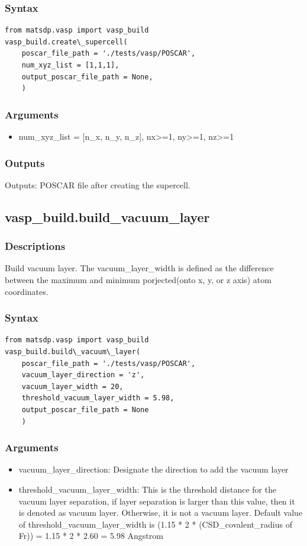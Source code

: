 \documentclass[12pt]{book}
\begin{document}
\subsubsection{Syntax}
\begin{lstlisting}
from matsdp.vasp import vasp_build
vasp_build.create\_supercell(
    poscar_file_path = './tests/vasp/POSCAR', 
    num_xyz_list = [1,1,1], 
    output_poscar_file_path = None,
    )
\end{lstlisting}

\subsubsection{Arguments}
\begin{itemize}
\item num\_xyz\_list = [n\_x, n\_y, n\_z], nx>=1, ny>=1, nz>=1
\end{itemize}

\subsubsection{Outputs}
Outputs: POSCAR file after creating the supercell.


\subsection{vasp\_build.build\_vacuum\_layer}
\subsubsection{Descriptions}
Build vacuum layer. The vacuum\_layer\_width is defined as the difference between the maximum and minimum porjected(onto x, y, or z axis) atom coordinates.

\subsubsection{Syntax}
\begin{lstlisting}
from matsdp.vasp import vasp_build
vasp_build.build\_vacuum\_layer(
    poscar_file_path = './tests/vasp/POSCAR', 
    vacuum_layer_direction = 'z', 
    vacuum_layer_width = 20, 
    threshold_vacuum_layer_width = 5.98, 
    output_poscar_file_path = None
    )
\end{lstlisting}

\subsubsection{Arguments}
\begin{itemize}
\item vacuum\_layer\_direction: Designate the direction to add the vacuum layer
\item threshold\_vacuum\_layer\_width: This is the threshold distance for the vacuum layer separation, if layer separation is larger than this value, then it is denoted as vacuum layer. Otherwise, it is not a vacuum layer. Default value of threshold\_vacuum\_layer\_width is (1.15 * 2 * (CSD\_covalent\_radius of Fr)) = 1.15 * 2 * 2.60 = 5.98 Angstrom
\end{itemize}
\end{document}
